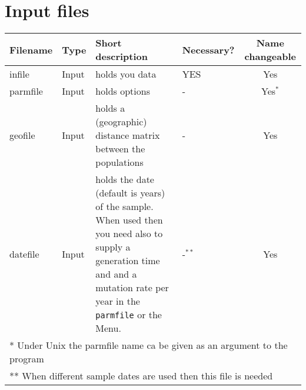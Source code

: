 \section{Input files}
\begin{center}
\begin{tabular}{l l p{7.0cm} l c}
\hline
Filename & Type & Short description & Necessary?  & Name changeable\\
\hline
infile & Input           & {holds you data} & YES & Yes\\
parmfile  & Input       & {holds options} & - & Yes$^{*}$\\
geofile & Input & {holds a (geographic) distance matrix between the populations} & - & Yes\\
\hline
datefile & Input & holds the date (default is years) of the sample. When used then you need also to supply a generation time and and a mutation rate per year in the {\tt parmfile} or the Menu. & -$^{**}$ & Yes\\
\hline
\hline
\multicolumn{5}{l}{* Under Unix the parmfile name ca be given as an argument to the program}\\
\multicolumn{5}{l}{** When different sample dates are used then this file is needed}
\end{tabular}
\end{center}
